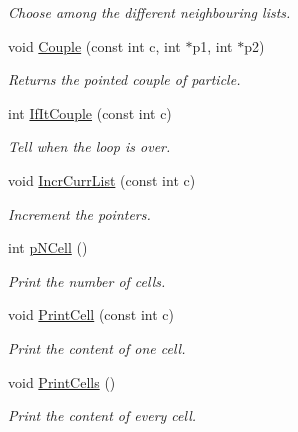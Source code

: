 \begin{DoxyCompactItemize}
\begin{DoxyCompactList}\small\item\em \-Choose among the different neighbouring lists. \end{DoxyCompactList}\item 
\hypertarget{classDdArray_aabccb7f79ac6e104734750f00fa72b76}{void \hyperlink{classDdArray_aabccb7f79ac6e104734750f00fa72b76}{\-Couple} (const int c, int $\ast$p1, int $\ast$p2)}\label{classDdArray_aabccb7f79ac6e104734750f00fa72b76}

\begin{DoxyCompactList}\small\item\em \-Returns the pointed couple of particle. \end{DoxyCompactList}\item 
\hypertarget{classDdArray_a3896db13faf370f18b2a70c6acd01930}{int \hyperlink{classDdArray_a3896db13faf370f18b2a70c6acd01930}{\-If\-It\-Couple} (const int c)}\label{classDdArray_a3896db13faf370f18b2a70c6acd01930}

\begin{DoxyCompactList}\small\item\em \-Tell when the loop is over. \end{DoxyCompactList}\item 
\hypertarget{classDdArray_a0c040f6773c460a8eb46bff752c08d2d}{void \hyperlink{classDdArray_a0c040f6773c460a8eb46bff752c08d2d}{\-Incr\-Curr\-List} (const int c)}\label{classDdArray_a0c040f6773c460a8eb46bff752c08d2d}

\begin{DoxyCompactList}\small\item\em \-Increment the pointers. \end{DoxyCompactList}\item 
\hypertarget{classDdArray_a02631cacc3cd393a64b7e78df3734e48}{int \hyperlink{classDdArray_a02631cacc3cd393a64b7e78df3734e48}{p\-N\-Cell} ()}\label{classDdArray_a02631cacc3cd393a64b7e78df3734e48}

\begin{DoxyCompactList}\small\item\em \-Print the number of cells. \end{DoxyCompactList}\item 
\hypertarget{classDdArray_af5188eb0e6caae79f8bf349bf2345cf2}{void \hyperlink{classDdArray_af5188eb0e6caae79f8bf349bf2345cf2}{\-Print\-Cell} (const int c)}\label{classDdArray_af5188eb0e6caae79f8bf349bf2345cf2}

\begin{DoxyCompactList}\small\item\em \-Print the content of one cell. \end{DoxyCompactList}\item 
\hypertarget{classDdArray_a1132024d8fdd721fd6a36781d4235162}{void \hyperlink{classDdArray_a1132024d8fdd721fd6a36781d4235162}{\-Print\-Cells} ()}\label{classDdArray_a1132024d8fdd721fd6a36781d4235162}

\begin{DoxyCompactList}\small\item\em \-Print the content of every cell. \end{DoxyCompactList}\end{DoxyCompactItemize}
